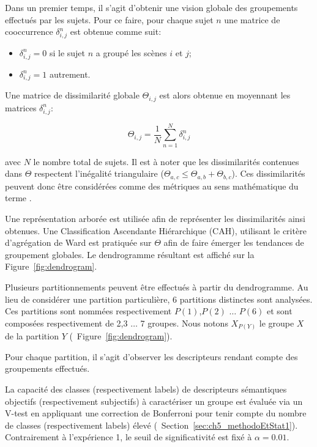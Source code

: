 Dans un premier temps, il s'agit d'obtenir une vision globale des groupements effectués par les sujets. Pour ce faire, pour chaque sujet $n$ une matrice de cooccurrence $\delta^n_{i,j}$ est obtenue comme suit:

\begin{itemize}
\item $\delta^n_{i,j}=0$ si le sujet $n$ a groupé les scènes $i$ et $j$;
\item $\delta^n_{i,j}=1$ autrement.
\end{itemize}

Une matrice de dissimilarité globale $\Theta_{i,j}$ est alors obtenue en moyennant les matrices $\delta^n_{i,j}$:

\begin{equation}
\Theta_{i,j}= \dfrac{1}{N} \sum_{n=1}^{N}  \delta^n_{i,j}
\end{equation}

avec $N$ le nombre total de sujets. Il est à noter que les dissimilarités contenues dans $\Theta$ respectent l'inégalité triangulaire ($\Theta_{a,c}\leq\Theta_{a,b}+\Theta_{b,c}$). Ces dissimilarités peuvent donc être considérées comme des métriques au sens mathématique du terme \citep{parizet2012application}. 

Une représentation arborée est utilisée afin de représenter les dissimilarités ainsi obtenues. Une Classification Ascendante Hiérarchique (CAH), utilisant le critère d’agrégation de Ward est pratiquée sur $\Theta$ afin de faire émerger les tendances de groupement globales. Le dendrogramme résultant est affiché sur la Figure~\ref{fig:dendrogram}. 

Plusieurs partitionnements peuvent être effectués à partir du dendrogramme. Au lieu de considérer une partition particulière, 6  partitions distinctes sont analysées. Ces partitions sont nommées respectivement $P(1)$,$P(2)$ $\ldots$ $P(6)$ et sont composées respectivement de 2,3 $\ldots$ 7 groupes. Nous notons $X_{P(Y)}$ le groupe $X$ de la partition $Y$ (\cf~Figure~\ref{fig:dendrogram}).

Pour chaque partition, il s'agit d'observer les descripteurs rendant compte des groupements effectués. 

La capacité des classes (respectivement labels) de descripteurs sémantiques objectifs (respectivement subjectifs) à caractériser un groupe est évaluée via un V-test en appliquant une correction de Bonferroni pour tenir compte du nombre de classes (respectivement labels) élevé (\cf~Section~\ref{sec:ch5_methodoEtStat1}). Contrairement à l'expérience 1, le seuil de significativité est fixé à $\alpha=0.01$.

